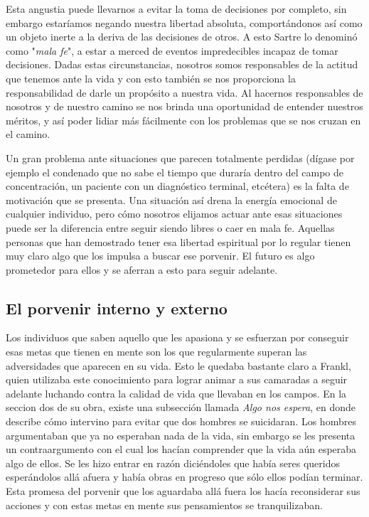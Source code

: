 \documentclass[12pt, letterpaper]{article}
\begin{document}
Esta angustia puede llevarnos a evitar la toma de decisiones por completo, sin embargo estaríamos negando nuestra libertad absoluta, comportándonos así como un objeto inerte a la deriva de las decisiones de otros. A esto Sartre lo denominó como "\textit{mala fe}", a estar a merced de eventos impredecibles incapaz de tomar decisiones. Dadas estas circunstancias, nosotros somos responsables de la actitud que tenemos ante la vida y con esto también se nos proporciona la responsabilidad de darle un propósito a nuestra vida. Al hacernos responsables de nosotros y de nuestro camino se nos brinda una oportunidad de entender nuestros méritos, y así poder lidiar más fácilmente con los problemas que se nos cruzan en el camino.

Un gran problema ante situaciones que parecen totalmente perdidas (dígase por ejemplo el condenado que no sabe el tiempo que duraría dentro del campo de concentración, un paciente con un diagnóstico terminal, etcétera) es la falta de motivación que se presenta. Una situación así drena la energía emocional de cualquier individuo, pero cómo nosotros elijamos actuar ante esas situaciones puede ser la diferencia entre seguir siendo libres o caer en mala fe. Aquellas personas que han demostrado tener esa libertad espiritual por lo regular tienen muy claro algo que los impulsa a buscar ese porvenir. El futuro es algo prometedor para ellos y se aferran a esto para seguir adelante.


\subsection*{El porvenir interno y externo}

Los individuos que saben aquello que les apasiona y se esfuerzan por conseguir esas metas que tienen en mente son los que regularmente superan las adversidades que aparecen en su vida. Esto le quedaba bastante claro a Frankl, quien utilizaba este conocimiento para lograr animar a sus camaradas a seguir adelante luchando contra la calidad de vida que llevaban en los campos. En la seccion dos de su obra, existe una subsección llamada \textit{Algo nos espera}, en donde describe cómo intervino para evitar que dos hombres se suicidaran. Los hombres argumentaban que ya no esperaban nada de la vida, sin embargo se les presenta un contraargumento con el cual los hacían comprender que la vida aún esperaba algo de ellos. Se les hizo entrar en razón diciéndoles que había seres queridos esperándolos allá afuera y había obras en progreso que sólo ellos podían terminar. Esta promesa del porvenir que los aguardaba allá fuera los hacía reconsiderar sus acciones y con estas metas en mente sus pensamientos se tranquilizaban.
\end{document}
